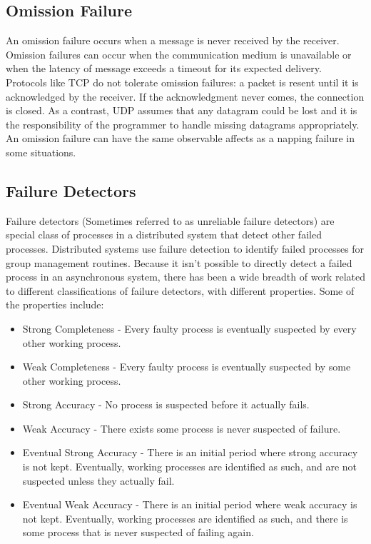 \subsection{Omission Failure}

An omission failure occurs when a message is never received by the receiver.
Omission failures can occur when the communication medium is unavailable or when the latency of message exceeds a timeout for its expected delivery.
Protocols like TCP do not tolerate omission failures: a packet is resent until it is acknowledged by the receiver.
If the acknowledgment never comes, the connection is closed.
As a contrast, UDP assumes that any datagram could be lost and it is the responsibility of the programmer to handle missing datagrams appropriately.
An omission failure can have the same observable affects as a napping failure in some situations. \cite{DISTRIBUTED}


\subsection{Failure Detectors}

Failure detectors \cite{FAILUREDETECTORS} (Sometimes referred to as unreliable failure detectors) are special class of processes in a distributed system that detect other failed processes. Distributed systems use failure detection to identify failed processes for group management routines. Because it isn't possible to directly detect a failed process in an asynchronous system, there has been a wide breadth of work related to different classifications of failure detectors, with different properties. Some of the properties include\cite{FAILUREDETECTORS}:

\begin{itemize}
    \item Strong Completeness - Every faulty process is eventually suspected by
        every other working process.
    \item Weak Completeness - Every faulty process is eventually suspected by 
        some other working process.
    \item Strong Accuracy - No process is suspected before it actually fails.
    \item Weak Accuracy - There exists some process is never suspected of failure.
    \item Eventual Strong Accuracy - There is an initial period where strong
        accuracy is not kept. Eventually, working processes are identified
        as such, and are not suspected unless they actually fail.
    \item Eventual Weak Accuracy - There is an initial period where weak
        accuracy is not kept. Eventually, working processes are identified
        as such, and there is some process that is never suspected of failing
        again.
\end{itemize} 

